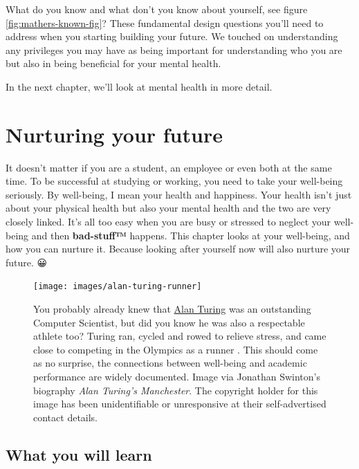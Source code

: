 \documentclass[
]{book}
\begin{document}
What do you know and what don't you know about yourself, see figure \ref{fig:mathers-known-fig}? These fundamental design questions you'll need to address when you starting building your future. We touched on understanding any privileges you may have as being important for understanding who you are but also in being beneficial for your mental health.

In the next chapter, we'll look at mental health in more detail.

\hypertarget{nurturing}{%
\chapter{Nurturing your future}\label{nurturing}}

It doesn't matter if you are a student, an employee or even both at the same time. To be successful at studying or working, you need to take your well-being seriously. By well-being, I mean your health and happiness. Your health isn't just about your physical health but also your mental health and the two are very closely linked. It's all too easy when you are busy or stressed to neglect your well-being and then \textbf{bad-stuff™} happens. This chapter looks at your well-being, and how you can nurture it. Because looking after yourself now will also nurture your future. 😀

\begin{figure}

{\centering \texttt{[image: images/alan-turing-runner]} 

}

\caption{You probably already knew that \href{https://en.wikipedia.org/wiki/Alan_Turing}{Alan Turing} was an outstanding Computer Scientist, but did you know he was also a respectable athlete too? Turing ran, cycled and rowed to relieve stress, and came close to competing in the Olympics as a runner \citep{kottke}. This should come as no surprise, the connections between well-being and academic performance are widely documented. Image via Jonathan Swinton's biography \emph{Alan Turing's Manchester}. \citep{manturing} The copyright holder for this image has been unidentifiable or unresponsive at their self-advertised contact details.}\label{fig:turing-fig}
\end{figure}



\hypertarget{ilo3}{%
\section{What you will learn}\label{ilo3}}
\end{document}
